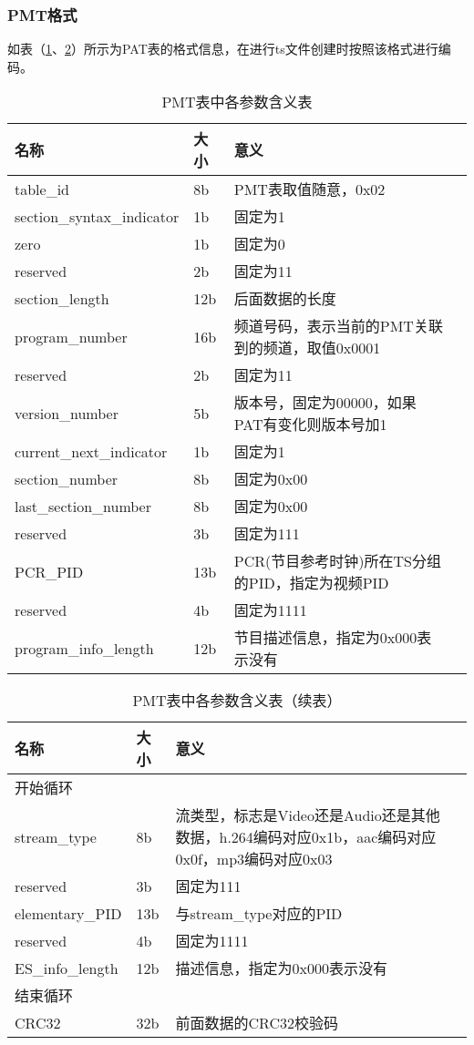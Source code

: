 \documentclass[bachelor]{thesis-uestc}
\begin{document}
\subsubsection{PMT格式}
如表（\ref{PMT表中各参数含义表}、\ref{PMT表中各参数含义表（续表）}）所示为PAT表的格式信息，在进行ts文件创建时按照该格式进行编码。
\begin{table}[!h]
\centering
\caption{PMT表中各参数含义表}
\label{PMT表中各参数含义表}
\begin{tabular}{lp{3cm}p{6cm}p{2cm}}
\toprule
名称	&  大小 & 意义 \\
\midrule

table\_id	&8b&	PMT表取值随意，0x02\\
section\_syntax\_indicator	&1b&	固定为1\\
zero	&1b&	固定为0\\
reserved	&2b&	固定为11\\
section\_length	&12b&	后面数据的长度\\
program\_number	&16b&	频道号码，表示当前的PMT关联到的频道，取值0x0001\\
reserved	&2b&	固定为11\\
version\_number	&5b&	版本号，固定为00000，如果PAT有变化则版本号加1\\
current\_next\_indicator	&1b&	固定为1\\
section\_number	&8b&	固定为0x00\\
last\_section\_number	&8b&	固定为0x00\\
reserved	&3b&	固定为111\\
PCR\_PID	&13b&	PCR(节目参考时钟)所在TS分组的PID，指定为视频PID\\

reserved	&4b&	固定为1111\\
program\_info\_length	&12b&	节目描述信息，指定为0x000表示没有\\


\bottomrule 
\end{tabular}
\end{table}

\begin{table}[!h]
\centering
\caption{PMT表中各参数含义表（续表）}
\label{PMT表中各参数含义表（续表）}
\begin{tabular}{lp{3cm}p{6cm}p{2cm}}
\toprule
名称	&  大小 & 意义 \\
\midrule
开始循环	 	 \\
stream\_type	&8b&	流类型，标志是Video还是Audio还是其他数据，h.264编码对应0x1b，aac编码对应0x0f，mp3编码对应0x03\\
reserved	&3b&	固定为111\\
elementary\_PID	&13b&	与stream\_type对应的PID\\
reserved	&4b&	固定为1111\\
ES\_info\_length	&12b&	描述信息，指定为0x000表示没有\\
结束循环	 \\	 
CRC32	&32b&	前面数据的CRC32校验码\\


\bottomrule 
\end{tabular}
\end{table}
\end{document}
